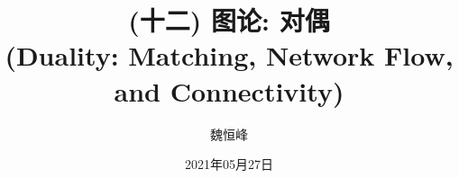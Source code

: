 \documentclass[]{beamer}
\title[(十二) 图论: 对偶]{(十二) 图论: 对偶
  \\(Duality: Matching, Network Flow, and Connectivity)}
\author[魏恒峰]{\large 魏恒峰}
\institute{hfwei@nju.edu.cn}
\date{2021年05月27日}
\begin{document}
\maketitle




\thankyou{}

\end{document}
